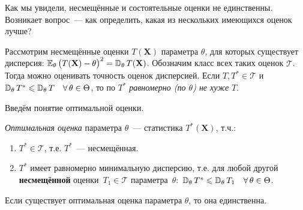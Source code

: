 Как мы увидели, несмещённые и состоятельные оценки не единственны.
Возникает вопрос~--- как определить, какая из нескольких имеющихся оценок лучше?

Рассмотрим несмещённые оценки $T(\mathbf{X})$ параметра $\theta$, для которых существует дисперсия: $\mathbb{E}_{\theta}\, \bigl(T(\mathbf{X})-\theta\bigr)^{2}=\mathbb{D}_{\theta}\, T(\mathbf{X})$.
Обозначим класс всех таких оценок $\mathcal{T}$.
Тогда можно оценивать точность оценок дисперсией.
Если $T, T^* \in \mathcal{T}$ и $\mathbb{D}_{\theta}\, T^* \leqslant \mathbb{D}_{\theta}\, T \quad \forall \, \theta \in \Theta$, то по $T^*$ \textit{равномерно (по $\theta$) не хуже} $T$.

Введём понятие оптимальной оценки.
\begin{defn}
    \textit{Оптимальная оценка} параметра $\theta$~--- статистика $T^*(\mathbf{X})$, т.ч.:
    \begin{enumerate}
        \item $T^* \in \mathcal{T}$, т.е. $T^*$~--- несмещённая.
        \item $T^*$ имеет равномерно минимальную дисперсию, т.е. для любой другой \textbf{несмещённой} оценки~$T_{1} \in \mathcal{T}$ параметра~$\theta \colon$ ${\mathbb{D}_{\theta}\, T^* \leqslant \mathbb{D}_{\theta}\, T_{1}} \quad {\forall \, \theta \in \Theta}$.
    \end{enumerate}
\end{defn}

\vspace{5mm}
\begin{thm*}
    Если существует оптимальная оценка параметра $\theta$, то она единственна.
\end{thm*}

